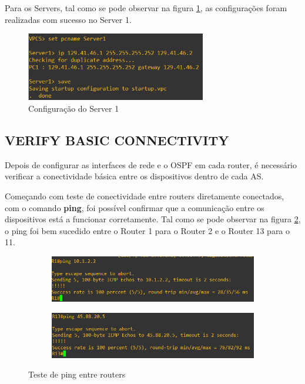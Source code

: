 \documentclass[11pt,english, openright, oneside]{book}
\begin{document}
\newpage
Para os Servers, tal como se pode observar na figura \ref{fig:configServer1}, as configurações foram realizadas com sucesso no Server 1.
\vspace{0.2cm}

\begin{figure}[H]
  \centering
  \includegraphics[width=0.70\textwidth]{imagens/Tarefa1/1.configServer1.png}
  \caption{Configuração do Server 1}
  \label{fig:configServer1}
\end{figure}
\vspace{0.2cm}

\subsection{VERIFY BASIC CONNECTIVITY}
\vspace{0.2cm}

Depois de configurar as interfaces de rede e o OSPF em cada router, é necessário verificar a conectividade básica entre os dispositivos dentro de cada AS.
\vspace{0.2cm}

Começando com teste de conectividade entre routers diretamente conectados, com o comando \textbf{ping}, foi possível confirmar que a comunicação entre os dispositivos está a funcionar corretamente. Tal como se pode observar na figura \ref{fig:testePing}, o ping foi bem sucedido entre o Router 1 para o Router 2 e o Router 13 para o 11.
\vspace{0.2cm}

\begin{figure}[h]
  \centering
  \begin{subfigure}{.5\textwidth}
      \centering
      \includegraphics[width=0.99\linewidth]{imagens/Tarefa1/2.pingR1_R2.png}
  \end{subfigure}%
  \begin{subfigure}{.5\textwidth}
      \centering
      \includegraphics[width=0.99\linewidth]{imagens/Tarefa1/2.pingR13_R11.png}
  \end{subfigure}
  \caption{Teste de ping entre routers}
  \label{fig:testePing}
\end{figure}
\vspace{0.2cm}
\end{document}
